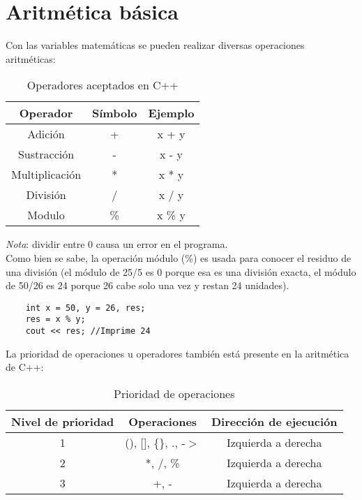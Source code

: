 \section{Aritmética básica}
Con las variables matemáticas se pueden realizar diversas operaciones aritméticas:
\begin{table}[ht]
    \begin{center}
        \caption{Operadores aceptados en C++}
        \label{tab: 1}
        \begin{tabular}{c c c}
            \hline
            \textbf{Operador}&\textbf{Símbolo}&\textbf{Ejemplo} \\
            \hline
            Adición&+&x + y \\
            Sustracción&-&x - y \\
            Multiplicación&*& x * y \\
            División&/& x / y \\
            Modulo&\%& x \% y \\
            \hline
        \end{tabular}
    \end{center}
\end{table}
\textit{Nota}: dividir entre 0 causa un error en el programa.\\
Como bien se sabe, la operación módulo (\%) es usada para conocer el residuo de una división (el módulo de 25/5 es 0 porque esa es una división exacta, el módulo de 50/26 es 24 porque 26 cabe solo una vez y restan 24 unidades).
\begin{lstlisting}
    int x = 50, y = 26, res;
    res = x % y;
    cout << res; //Imprime 24
\end{lstlisting}
La prioridad de operaciones u operadores también está presente en la aritmética de C++:
\begin{table}[ht]
    \begin{center}
        \caption{Prioridad de operaciones}
        \label{tab: 2}
        \begin{tabular}{c c c}
            \hline
            \textbf{Nivel de prioridad}&\textbf{Operaciones}&\textbf{Dirección de ejecución} \\
            \hline
            1&(), [], \{\}, ., -$>$&Izquierda a derecha \\
            2&*, /, \%&Izquierda a derecha \\
            3&+, -&Izquierda a derecha \\
            \hline
        \end{tabular}
    \end{center}
\end{table}



